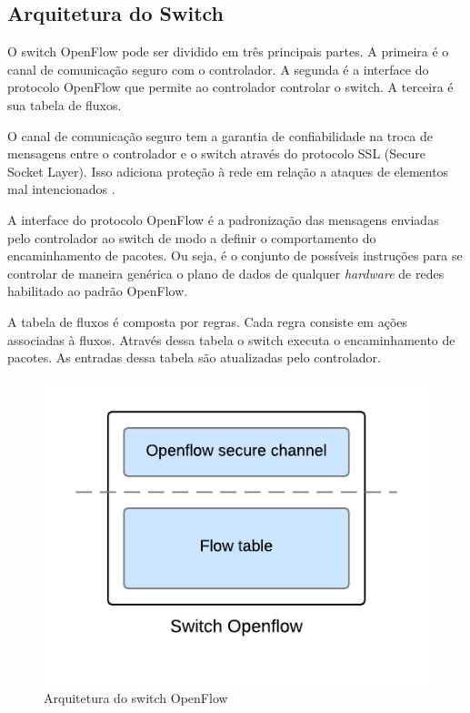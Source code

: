 \subsection{Arquitetura do Switch}

O switch OpenFlow pode ser dividido em três principais partes. 
A primeira é o canal de comunicação seguro com o controlador.
A segunda é a interface do protocolo OpenFlow que permite ao controlador
controlar o switch.
A terceira é sua tabela de fluxos.

O canal de comunicação seguro tem a garantia de confiabilidade na troca 
de mensagens entre o controlador e o switch através do protocolo SSL 
(Secure Socket Layer). 
Isso adiciona proteção à rede em relação a ataques de elementos mal 
intencionados \citep{rothenberg2010openflow}.

A interface do protocolo OpenFlow é a padronização das mensagens enviadas 
pelo controlador ao switch de modo a definir o comportamento do encaminhamento
de pacotes. 
Ou seja, é o conjunto de possíveis instruções para se controlar de maneira
genérica o plano de dados de qualquer \emph{hardware} de redes habilitado 
ao padrão OpenFlow.

A tabela de fluxos é composta por regras.
Cada regra consiste em ações associadas à fluxos. 
Através dessa tabela o switch executa o encaminhamento de pacotes. 
As entradas dessa tabela são atualizadas pelo controlador.

\begin{figure}[h!]
    \centering
    \label{fig:switch-arch}
    \includegraphics[width=\linewidth]{img/switch-architecture}
    \caption{Arquitetura do switch OpenFlow}
\end{figure}


